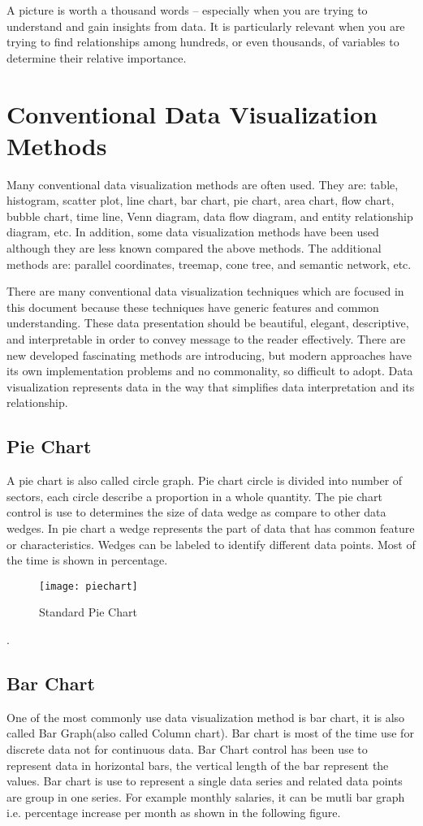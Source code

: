 
A picture is worth a thousand words – especially when you are trying to understand and gain insights from data. It is particularly relevant when you are trying to find relationships among hundreds, or even thousands, of variables to determine their relative importance.
\section{Conventional Data Visualization Methods}
Many conventional data visualization methods are often used. They are: table, histogram, scatter plot, line chart, bar chart, pie chart, area chart, flow chart, bubble chart, time line, Venn diagram, data flow diagram, and entity relationship diagram, etc. In addition, some data visualization methods have been used although they are less known compared the above methods. The additional methods are: parallel coordinates, treemap, cone tree, and semantic network, etc.
\par
There are many conventional data visualization techniques which are focused in this document because these techniques have generic features and common understanding. These data presentation should be beautiful, elegant, descriptive, and interpretable in order to convey message to the reader effectively. There are new developed fascinating methods are introducing, but modern approaches have its own implementation problems and no commonality, so difficult to adopt. Data visualization represents data in the way that simplifies data interpretation and its relationship.
\subsection{Pie Chart}
A pie chart is also called circle graph. Pie chart circle is divided into number of sectors, each circle describe a proportion in a whole quantity. The pie chart control is use to determines the size of data wedge as compare to other data wedges. In pie chart a wedge represents the part of data that has common feature or characteristics. Wedges can be labeled to identify different data points. Most of the time is shown in percentage.
\begin{figure}[h]
	\texttt{[image: piechart]}
	\centering
	\caption{Standard Pie Chart}
\end{figure}.
\subsection{Bar Chart}
One of the most commonly use data visualization method is bar chart, it is also called Bar Graph(also called Column chart). Bar chart is most of the time use for discrete data not for continuous data. Bar Chart control has been use to represent data in horizontal bars, the vertical length of the bar represent the values. Bar chart is use to represent a single data series and related data points are group in one series. For example monthly salaries, it can be mutli bar graph i.e. percentage increase per month as shown in the following figure.

